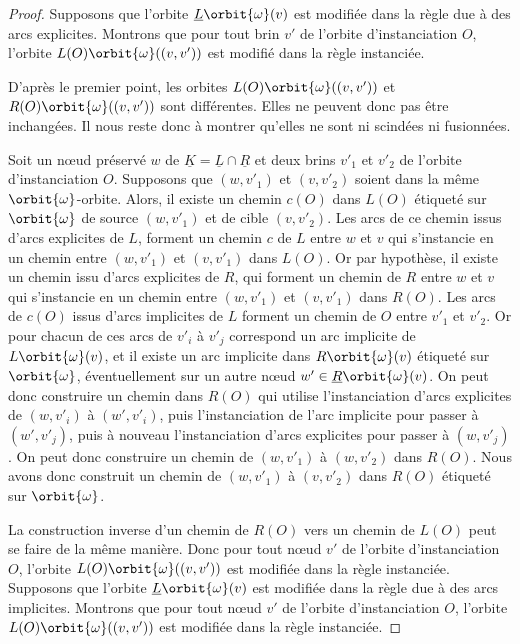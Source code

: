 \begin{proof}
	Supposons que l'orbite $\underline{L}\orbit{\omega}(v)$ est modifiée dans la règle due à des arcs explicites. %
	Montrons que pour tout brin $v'$ de l'orbite d'instanciation $O$, l'orbite $L(O)\orbit{\omega}((v, v'))$ est modifié dans la règle instanciée. %

	D'après le premier point, les orbites $L(O)\orbit{\omega}((v, v'))$ et $R(O)\orbit{\omega}((v, v'))$ sont différentes. %
	Elles ne peuvent donc pas être inchangées. %
	Il nous reste donc à montrer qu'elles ne sont ni scindées ni fusionnées. %

	Soit un nœud préservé $w$ de $\underline{K} = \underline{L} \cap \underline{R}$ et deux brins $v'_1$ et $v'_2$ de l'orbite d'instanciation $O$. %
	Supposons que $(w, v'_1)$ et $(v, v'_2)$ soient dans la même $\orbit{\omega}$-orbite. %
	Alors, il existe un chemin $c(O)$ dans $L(O)$ étiqueté sur $\orbit{\omega}$ de source $(w, v'_1)$ et de cible $(v, v'_2)$. %
	Les arcs de ce chemin issus d'arcs explicites de $L$, forment un chemin $c$ de $L$ entre $w$ et $v$ qui s'instancie en un chemin entre $(w, v'_1)$ et $(v, v'_1)$ dans $L(O)$. %
	Or par hypothèse, il existe un chemin issu d'arcs explicites de $R$, qui forment un chemin de $R$ entre $w$ et $v$ qui s'instancie en un chemin entre $(w, v'_1)$ et $(v, v'_1)$ dans $R(O)$. %
	Les arcs de $c(O)$ issus d'arcs implicites de $L$ forment un chemin de $O$ entre $v'_1$ et $v'_2$. %
	Or pour chacun de ces arcs de $v'_i$ à $v'_j$ correspond un arc implicite de $L\orbit{\omega}(v)$, et il existe un arc implicite dans $R\orbit{\omega}(v)$ étiqueté sur $\orbit{\omega}$, éventuellement sur un autre nœud $w' \in \underline{R}\orbit{\omega}(v)$. %
	On peut donc construire un chemin dans $R(O)$ qui utilise l'instanciation d'arcs explicites de $(w, v'_i)$ à $(w', v'_i)$, puis l'instanciation de l'arc implicite pour passer à $(w', v'_j)$, puis à nouveau l'instanciation d'arcs explicites pour passer à $(w, v'_j)$. %
	On peut donc construire un chemin de $(w, v'_1)$ à $(w, v'_2)$ dans $R(O)$. %
	Nous avons donc construit un chemin de $(w, v'_1)$ à $(v, v'_2)$ dans $R(O)$ étiqueté sur $\orbit{\omega}$.

	La construction inverse d'un chemin de $R(O)$ vers un chemin de $L(O)$ peut se faire de la même manière. %
	Donc pour tout nœud $v'$ de l'orbite d'instanciation $O$, l'orbite $L(O)\orbit{\omega}((v, v'))$ est modifiée dans la règle instanciée.
	\\ %

	Supposons que l'orbite $\underline{L}\orbit{\omega}(v)$ est modifiée dans la règle due à des arcs implicites. %
	Montrons que pour tout nœud $v'$ de l'orbite d'instanciation $O$, l'orbite $L(O)\orbit{\omega}((v, v'))$ est modifiée dans la règle instanciée. %


\end{proof}
